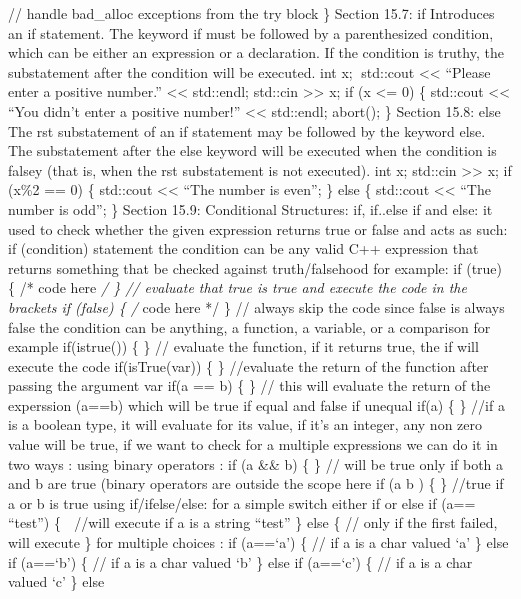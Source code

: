// handle bad\_alloc exceptions from the try block \} Section 15.7: if
Introduces an if statement. The keyword if must be followed by a
parenthesized condition, which can be either an expression or a
declaration. If the condition is truthy, the substatement after the
condition will be executed. int x; std::cout \textless\textless{}
``Please enter a positive number.'' \textless\textless{} std::endl;
std::cin \textgreater\textgreater{} x; if (x \textless= 0) \{ std::cout
\textless\textless{} ``You didn't enter a positive number!''
\textless\textless{} std::endl; abort(); \} Section 15.8: else The rst
substatement of an if statement may be followed by the keyword else. The
substatement after the else keyword will be executed when the condition
is falsey (that is, when the rst substatement is not executed). int x;
std::cin \textgreater\textgreater{} x; if (x\%2 == 0) \{ std::cout
\textless\textless{} ``The number is even\n''; \} else \{ std::cout
\textless\textless{} ``The number is odd\n''; \} Section 15.9:
Conditional Structures: if, if..else if and else: it used to check
whether the given expression returns true or false and acts as such: if
(condition) statement the condition can be any valid C++ expression that
returns something that be checked against truth/falsehood for example:
if (true) \{ /* code here \emph{/ \} // evaluate that true is true and
execute the code in the brackets if (false) \{ /} code here */ \} //
always skip the code since false is always false the condition can be
anything, a function, a variable, or a comparison for example
if(istrue()) \{ \} // evaluate the function, if it returns true, the if
will execute the code if(isTrue(var)) \{ \} //evaluate the return of the
function after passing the argument var if(a == b) \{ \} // this will
evaluate the return of the experssion (a==b) which will be true if equal
and false if unequal if(a) \{ \} //if a is a boolean type, it will
evaluate for its value, if it's an integer, any non zero value will be
true, if we want to check for a multiple expressions we can do it in two
ways : using binary operators : if (a \&\& b) \{ \} // will be true only
if both a and b are true (binary operators are outside the scope here if
(a \textbar\textbar{} b ) \{ \} //true if a or b is true using
if/ifelse/else: for a simple switch either if or else if (a== ``test'')
\{  //will execute if a is a string ``test'' \} else \{ // only if the
first failed, will execute \} for multiple choices : if (a==`a') \{ //
if a is a char valued `a' \} else if (a==`b') \{ // if a is a char
valued `b' \} else if (a==`c') \{ // if a is a char valued `c' \} else
